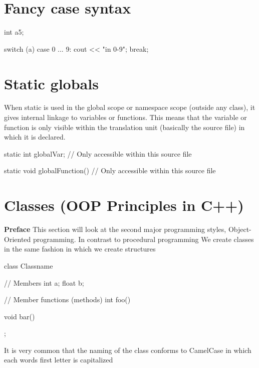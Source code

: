 \documentclass{report}
\begin{document}
    \pagebreak \bigbreak \noindent 
    \section{\LARGE Fancy case syntax}
    \bigbreak \noindent 
    \begin{cppcode}
int a{5};

switch (a) {
    case 0 ... 9: cout << "in 0-9";
    break;
}
    \end{cppcode}

    \bigbreak \noindent 
    \section{Static globals}
    \bigbreak \noindent 
    When static is used in the global scope or namespace scope (outside any class), it gives internal linkage to variables or functions. This means that the variable or function is only visible within the translation unit (basically the source file) in which it is declared.
    \bigbreak \noindent 
    \begin{cppcode}
    static int globalVar; // Only accessible within this source file

    static void globalFunction() {
        // Only accessible within this source file
    }
    \end{cppcode}

    \pagebreak \bigbreak \noindent 
    \section{\LARGE Classes (OOP Principles in C++)}
    \bigbreak \noindent 
    \textbf{Preface} This section will look at the second major programming styles, Object-Oriented programming. In contrast to procedural programming
    \bigbreak \noindent 
    We create classes in the same fashion in which we create structures
    \bigbreak \noindent 
    
    \begin{cppcode}
class Classname {

    // Members
    int a;
    float b;

    // Member functions (methods)
    int foo() {

    }

    void bar() {

    }

};
    \end{cppcode}
    
    \bigbreak \noindent 
    It is very common that the naming of the class conforms to CamelCase in which each words first letter is capitalized
\end{document}
